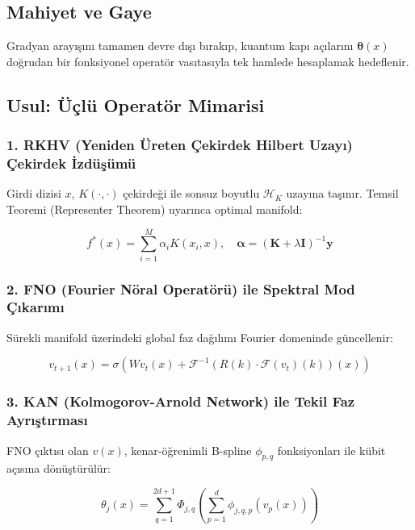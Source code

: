\documentclass[11pt, a4paper]{article}
\begin{document}
\subsection{Mahiyet ve Gaye}
Gradyan arayışını tamamen devre dışı bırakıp, kuantum kapı açılarını $\bm{\theta}(x)$ doğrudan bir fonksiyonel operatör vasıtasıyla tek hamlede hesaplamak hedeflenir.

\subsection{Usul: Üçlü Operatör Mimarisi}

\subsubsection{1. RKHV (Yeniden Üreten Çekirdek Hilbert Uzayı) Çekirdek İzdüşümü}
Girdi dizisi $x$, $K(\cdot, \cdot)$ çekirdeği ile sonsuz boyutlu $\mathcal{H}_K$ uzayına taşınır. Temsil Teoremi (Representer Theorem) uyarınca optimal manifold:

\begin{equation}
f^*(x) = \sum_{i=1}^M \alpha_i K(x_i, x), \quad \bm{\alpha} = (\mathbf{K} + \lambda \mathbf{I})^{-1} \mathbf{y}
\end{equation}

\subsubsection{2. FNO (Fourier Nöral Operatörü) ile Spektral Mod Çıkarımı}
Sürekli manifold üzerindeki global faz dağılımı Fourier domeninde güncellenir:

\begin{equation}
v_{t+1}(x) = \sigma \left( W v_t(x) + \mathcal{F}^{-1} \left( R(k) \cdot \mathcal{F}(v_t)(k) \right)(x) \right)
\end{equation}

\subsubsection{3. KAN (Kolmogorov-Arnold Network) ile Tekil Faz Ayrıştırması}
FNO çıktısı olan $v(x)$, kenar-öğrenimli B-spline $\phi_{p,q}$ fonksiyonları ile kübit açısına dönüştürülür:

\begin{equation}
\theta_j(x) = \sum_{q=1}^{2d+1} \Phi_{j,q} \left( \sum_{p=1}^d \phi_{j,q,p}(v_p(x)) \right)
\end{equation}
\end{document}
